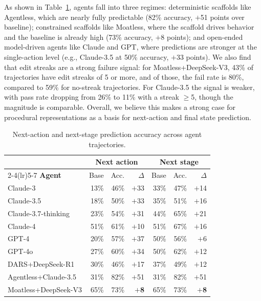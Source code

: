 \documentclass[11pt]{article}
\begin{document}
  As shown in Table~\ref{tab:trajectory_holdouts}, agents fall into three regimes: deterministic scaffolds like Agentless,
  which are nearly fully predictable (82\% accuracy, $+$51 points over baseline); constrained scaffolds like Moatless,
  where the scaffold drives behavior and the baseline is already high (73\% accuracy, $+$8 points); and open-ended
  model-driven agents like Claude and GPT, where predictions are stronger at the single-action level (e.g., Claude-3.5 at
  50\% accuracy, $+$33 points). We also find
  that edit streaks are a strong failure signal: for Moatless+DeepSeek-V3, 43\% of trajectories have edit streaks of 5 or
  more, and of those, the fail rate is 80\%, compared to 59\% for no-streak trajectories. For Claude-3.5 the signal is
  weaker, with pass rate dropping from 26\% to 11\% with a streak $\geq$5, though the magnitude is comparable. Overall, we believe this makes a
  strong case for procedural representations as a basis for next-action and final state prediction.


  \begin{table}[htbp!]
  \centering\small\setlength{\tabcolsep}{4pt}
  \begin{tabular}{lrrrrrr}
  \toprule
  & \multicolumn{3}{c}{\textbf{Next action}} & \multicolumn{3}{c}{\textbf{Next stage}} \\
  \cmidrule(lr){2-4}\cmidrule(lr){5-7}
  \textbf{Agent} & Base & Acc. & $\Delta$ & Base & Acc. & $\Delta$ \\
  \midrule
  \rowcolor{claudebg} Claude-3              & 13\% & 46\% & $+$33 & 33\% & 47\% & $+$14 \\
  \rowcolor{claudebg} Claude-3.5            & 18\% & 50\% & $+$33 & 35\% & 51\% & $+$16 \\
  \rowcolor{claudebg} Claude-3.7-thinking   & 23\% & 54\% & $+$31 & 44\% & 65\% & $+$21 \\
  \rowcolor{claudebg} Claude-4              & 51\% & 61\% & $+$10 & 51\% & 67\% & $+$16 \\
  \midrule
  \rowcolor{gptbg} GPT-4                 & 20\% & 57\% & $+$37 & 50\% & 56\% & $+$6  \\
  \rowcolor{gptbg} GPT-4o                & 27\% & 60\% & $+$34 & 50\% & 62\% & $+$12 \\
  \midrule
  \rowcolor{owbg} DARS+DeepSeek-R1      & 30\% & 46\% & $+$17 & 37\% & 49\% & $+$12 \\
  \rowcolor{owbg} Agentless+Claude-3.5  & 31\% & 82\% & $+$51 & 31\% & 82\% & $+$51 \\
  \rowcolor{owbg} Moatless+DeepSeek-V3  & 65\% & 73\% & \textbf{$+$8} & 65\% & 73\% & \textbf{$+$8} \\
  \bottomrule
  \end{tabular}
  \caption{Next-action and next-stage prediction accuracy across agent trajectories.}
  \label{tab:trajectory_holdouts}
  \end{table}
\end{document}

